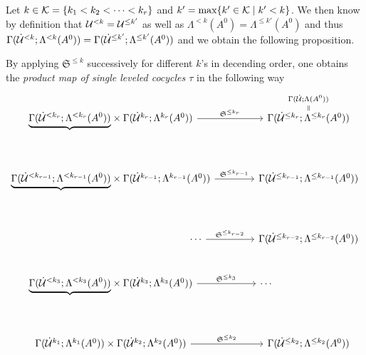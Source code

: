 Let $k\in\mathcal{K}=\{k_1<k_2<\dots<k_r\}$ and $k'=\max\{k'\in\mathcal{K}\mid k'<k\}$. We then
know by definition that $\mathcal{U}^{<k}=\mathcal{U}^{\leq k'}$ as well as
$\Lambda^{< k}(A^0)=\Lambda^{\leq k'}(A^0)$ and thus
$\Gamma(\dot{\mathcal{U}}^{< k};\Lambda^{< k}(A^0))=
\Gamma(\dot{\mathcal{U}}^{\leq k'};\Lambda^{\leq k'}(A^0))$ and we obtain the following
proposition.
\begin{prop}\label{prop:theMapTau}
  By applying $\mathfrak{S}^{\leq k}$ successively for different $k$'s
  in decending order, one obtains the \emph{product map of single leveled
  cocycles $\tau$} in the following way
  \[ \begin{tikzcd}[column sep=1.4cm,row sep=.9cm]
      \underset{\tikzmark{e1}}{\underbrace{%
        \Gamma(\dot\cU^{<k_r};\Lambda^{<k_r}(A^0))}}
      \times
      \Gamma(\dot\cU^{k_r};\Lambda^{k_r}(A^0))
      \rar{\mathfrak{S}^{\leq k_r}}&
      \overset{\normalsize\Gamma(\dot\cU;\Lambda(A^0))}{%
        \overset{\normalsize\text{\rotatebox[origin=c]{-90}{$=$}}}{%
          \Gamma(\dot\cU^{\leq k_r};\Lambda^{\leq k_r}(A^0))
      }}
      \\\underset{\tikzmark{e2}}{\underbrace{%
        \Gamma(\dot\cU^{<k_{r-1}};\Lambda^{<k_{r-1}}(A^0))}}
      \times
      \Gamma(\dot\cU^{k_{r-1}};\Lambda^{k_{r-1}}(A^0))
      \rar{\mathfrak{S}^{\leq k_{r-1}}}&
      \overset{\tikzmark{n1}}{%
        \Gamma(\dot\cU^{\leq k_{r-1}};\Lambda^{\leq k_{r-1}}(A^0))}
      \\\hspace{6cm}\cdots \rar{\mathfrak{S}^{\leq k_{r-2}}}&
      \overset{\tikzmark{n2}}{%
        \Gamma(\dot\cU^{\leq k_{r-2}};\Lambda^{\leq k_{r-2}}(A^0))}
      \\\underset{\tikzmark{eEND}}{\underbrace{%
        \Gamma(\dot\cU^{<k_3};\Lambda^{<k_3}(A^0))}}
      \times
      \Gamma(\dot\cU^{k_3};\Lambda^{k_3}(A^0))
      \rar{\mathfrak{S}^{\leq k_3}}&
      \cdots\hspace{3cm}
      \\
      \Gamma(\dot\cU^{k_1};\Lambda^{k_1}(A^0))
      \times
      \Gamma(\dot\cU^{k_2};\Lambda^{k_2}(A^0))
      \rar{\mathfrak{S}^{\leq k_2}}&
      \overset{\tikzmark{nEND}}{%
        \Gamma(\dot\cU^{\leq k_2};\Lambda^{\leq k_2}(A^0))}
  \end{tikzcd} \]
\end{prop}
